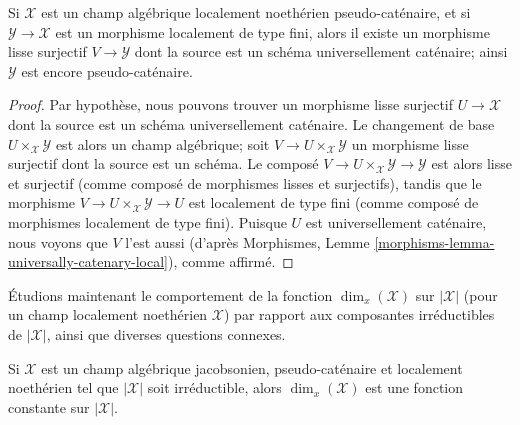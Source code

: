 \begin{lemma}
\label{lemma-catenary-covers}
Si $\mathcal{X}$ est un champ algébrique localement noethérien
pseudo-caténaire, et si $\mathcal{Y} \to \mathcal{X}$ est un morphisme
localement de type fini,
alors il existe un morphisme lisse surjectif $V \to \mathcal{Y}$
dont la source est un schéma universellement caténaire; ainsi
$\mathcal{Y}$ est encore pseudo-caténaire.
\end{lemma}

\begin{proof}
Par hypothèse, nous pouvons trouver un morphisme lisse surjectif
$U \to \mathcal{X}$ dont la source est un schéma universellement caténaire.
Le changement de base $U\times_{\mathcal{X}} \mathcal{Y}$ est alors un champ
algébrique; soit $V \to U\times_{\mathcal{X}} \mathcal{Y}$ un morphisme lisse
surjectif dont la source est un schéma.
Le composé $V \to U\times_{\mathcal{X}} \mathcal{Y} \to \mathcal{Y}$ est alors
lisse et surjectif (comme composé de morphismes lisses et
surjectifs), tandis que le morphisme $V \to U\times_{\mathcal{X}}
\mathcal{Y} \to U$ est localement de type fini (comme composé
de morphismes localement de type fini). Puisque $U$
est universellement caténaire, nous voyons que $V$ l'est aussi
(d'après Morphismes, Lemme
\ref{morphisms-lemma-universally-catenary-local}),
comme affirmé.
\end{proof}

\noindent
Étudions maintenant le comportement de la fonction $\dim_x(\mathcal{X})$ sur
$|\mathcal{X}|$
(pour un champ localement noethérien $\mathcal{X}$) par rapport aux
composantes
irréductibles de $|\mathcal{X}|$, ainsi que diverses
questions connexes.

\begin{lemma}
\label{lemma-irreducible-implies-equidimensional}
Si $\mathcal{X}$ est
un champ algébrique jacobsonien, pseudo-caténaire et localement noethérien
tel que $|\mathcal{X}|$ soit irréductible,
alors $\dim_x(\mathcal{X})$ est une fonction constante sur $|\mathcal{X}|$.
\end{lemma}

